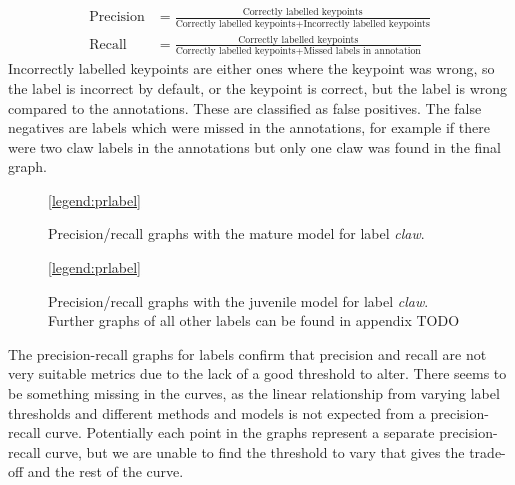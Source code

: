 \begin{align}
\text{Precision} &= \frac{\text{Correctly labelled keypoints}}{\text{Correctly labelled keypoints} + \text{Incorrectly labelled keypoints}}
\\[10pt]
\text{Recall} &= \frac{\text{Correctly labelled keypoints}}{\text{Correctly labelled keypoints} + \text{Missed labels in annotation}}
\end{align}
Incorrectly labelled keypoints are either ones where the keypoint was wrong, so the label is incorrect by default, or the keypoint is correct, but the label is wrong compared to the annotations. These are classified as false positives. The false negatives are labels which were missed in the annotations, for example if there were two claw labels in the annotations but only one claw was found in the final graph. 

\begin{figure}[H]
\centering
{}
\ref{legend:prlabel}
\caption{Precision/recall graphs with the mature model for label \textit{claw}.}
\end{figure}

\begin{figure}[H]
\centering
{}
\ref{legend:prlabel}
\caption{Precision/recall graphs with the juvenile model for label \textit{claw}. Further graphs of all other labels can be found in appendix TODO}
\end{figure}
\noindent
The precision-recall graphs for labels confirm that precision and recall are not very suitable metrics due to the lack of a good threshold to alter. There seems to be something missing in the curves, as the linear relationship from varying label thresholds and different methods and models is not expected from a precision-recall curve. Potentially each point in the graphs represent a separate precision-recall curve, but we are unable to find the threshold to vary that gives the trade-off and the rest of the curve.
%
%
%


